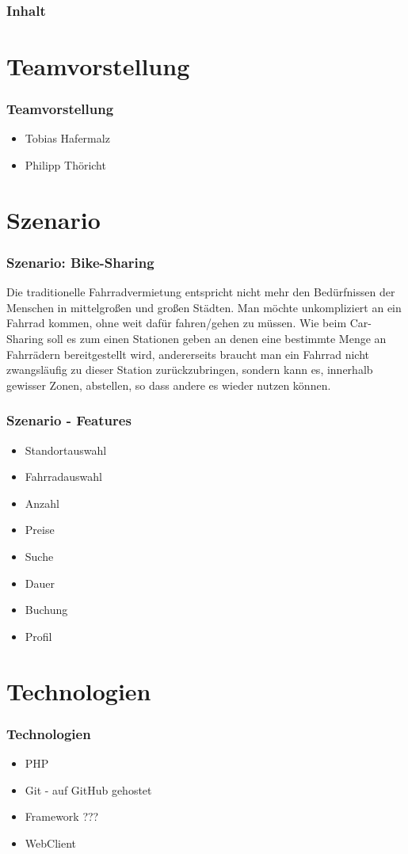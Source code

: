 \begin{frame}
	\frametitle*{Inhalt}
	\tableofcontents
\end{frame}

\section{Teamvorstellung}
\begin{frame}
	\frametitle*{Teamvorstellung}
	\begin{itemize}
		\item Tobias Hafermalz
		\item Philipp Thöricht
	\end{itemize}
\end{frame}

\section{Szenario}
\begin{frame}
	\frametitle*{Szenario: Bike-Sharing} 
	Die traditionelle Fahrradvermietung entspricht nicht mehr den Bedürfnissen der Menschen in mittelgroßen und großen Städten.
	Man möchte unkompliziert an ein Fahrrad kommen, ohne weit dafür fahren/gehen zu müssen.
	Wie beim Car-Sharing soll es zum einen Stationen geben an denen eine bestimmte Menge an Fahrrädern bereitgestellt wird, andererseits braucht man ein Fahrrad nicht zwangsläufig zu dieser Station zurückzubringen, sondern kann es, innerhalb gewisser Zonen, abstellen, so dass andere es wieder nutzen können.
\end{frame}

\begin{frame}
	\frametitle*{Szenario - Features}
	\begin{itemize}
		\item Standortauswahl
		\item Fahrradauswahl 
		\item Anzahl
		\item Preise
		\item Suche
		\item Dauer
		\item Buchung
		\item Profil
	\end{itemize}
\end{frame}

\section{Technologien}
\begin{frame}
	\frametitle*{Technologien}
	\begin{itemize}
		\item PHP
		\item Git - auf GitHub gehostet
		\item Framework ???
		\item WebClient
	\end{itemize}
\end{frame}

